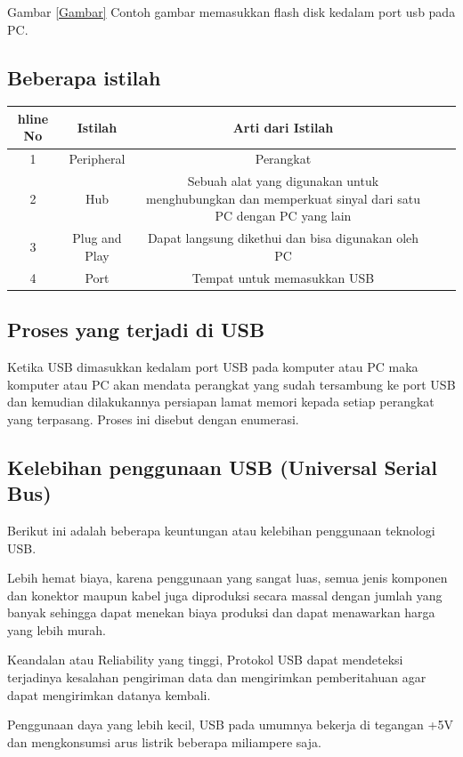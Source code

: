       Gambar \ref{Gambar} Contoh gambar memasukkan flash disk kedalam port usb pada PC.
	  
\subsection {Beberapa istilah}	  
\begin{table}[H]
\begin{tabular}{|c|c|c|c|c|}
hline
No & Istilah & Arti dari Istilah\\
\hline
1   & Peripheral & Perangkat\\
2   & Hub & Sebuah alat yang digunakan untuk menghubungkan dan memperkuat sinyal dari satu PC dengan PC yang lain\\
3   & Plug and Play & Dapat langsung dikethui dan bisa digunakan oleh PC\\
4   & Port & Tempat untuk memasukkan USB\\
\hline
\end{tabular}
\end{table}


\subsection {Proses yang terjadi di USB}
	Ketika USB dimasukkan kedalam port USB pada komputer atau PC maka komputer atau PC akan mendata perangkat yang sudah tersambung ke port USB dan kemudian dilakukannya persiapan lamat memori kepada setiap perangkat yang terpasang. Proses ini disebut dengan enumerasi.
	
\subsection {Kelebihan penggunaan USB (Universal Serial Bus)}
	Berikut ini adalah beberapa keuntungan atau kelebihan penggunaan teknologi USB.
\item
Lebih hemat biaya, karena penggunaan yang sangat luas, semua jenis komponen dan konektor maupun kabel juga diproduksi secara massal dengan jumlah yang banyak sehingga dapat menekan biaya produksi dan dapat menawarkan harga yang lebih murah.	
\item
Keandalan atau Reliability yang tinggi, Protokol USB dapat mendeteksi terjadinya kesalahan pengiriman data dan mengirimkan pemberitahuan agar dapat mengirimkan datanya kembali.
\item
Penggunaan daya yang lebih kecil, USB pada umumnya bekerja di tegangan +5V dan mengkonsumsi arus listrik beberapa miliampere saja.


